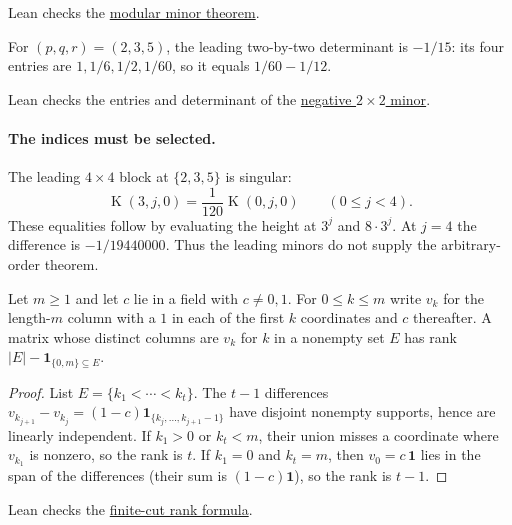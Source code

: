 \documentclass[11pt]{article}
\newcommand{\Kernel}{\operatorname{K}}
\begin{document}
\noindent Lean checks the \href{https://github.com/wcook04/plectis-erdos/blob/f36a98bf3d3e6f65f1074e3b800e3293d5b8a51a/ErdosProblems/Erdos269/PaperR7ModularMinors.lean#L133}{modular minor theorem}.



\begin{example}\label{res:rank}
For $(p,q,r)=(2,3,5)$, the leading two-by-two determinant is $-1/15$:
its four entries are $1,1/6,1/2,1/60$, so it equals $1/60-1/12$.
\end{example}

\noindent Lean checks the entries and determinant of the \href{https://github.com/wcook04/plectis-erdos/blob/f36a98bf3d3e6f65f1074e3b800e3293d5b8a51a/ErdosProblems/Erdos269/PaperR7BasicAssembly.lean#L102}{negative $2\times2$ minor}.

\paragraph{The indices must be selected.}
The leading $4\times4$ block at $\{2,3,5\}$ is singular:
\[
 \Kernel(3,j,0)=\frac1{120}\Kernel(0,j,0)\qquad(0\le j<4).
\]
These equalities follow by evaluating the height at $3^j$ and $8\cdot3^j$.
At $j=4$ the difference is $-1/19440000$.
Thus the leading minors do not supply the arbitrary-order theorem.


\begin{proposition}\label{res:finite-cut-rank}
Let $m\ge1$ and let $c$ lie in a field with $c\ne 0,1$.
For $0\le k\le m$ write $v_k$ for the length-$m$ column with a $1$ in each of
the first $k$ coordinates and $c$ thereafter.
A matrix whose distinct columns are $v_k$ for $k$ in a nonempty set $E$ has
rank $|E|-\mathbf 1_{\{0,m\}\subseteq E}$.
\end{proposition}

\begin{proof}
List $E=\{k_1<\cdots<k_t\}$.  The $t-1$ differences
$v_{k_{j+1}}-v_{k_j}=(1-c)\mathbf 1_{\{k_j,\ldots,k_{j+1}-1\}}$
have disjoint nonempty supports, hence are linearly independent.
If $k_1>0$ or $k_t<m$, their union misses a coordinate where $v_{k_1}$ is
nonzero, so the rank is $t$.
If $k_1=0$ and $k_t=m$, then $v_0=c\,\mathbf 1$ lies in the span of the
differences (their sum is $(1-c)\mathbf 1$), so the rank is $t-1$.
\end{proof}

\noindent Lean checks the \href{https://github.com/wcook04/plectis-erdos/blob/f36a98bf3d3e6f65f1074e3b800e3293d5b8a51a/ErdosProblems/Erdos269/PaperR7FiniteCutRank.lean#L182}{finite-cut rank formula}.
\end{document}
